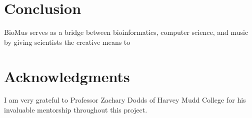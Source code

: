 \documentclass[letterpaper]{article}
\begin{document}
\section{Conclusion}
BioMus serves as a bridge between bioinformatics, computer science, and music by giving scientists the creative means to 


\section{Acknowledgments}

I am very grateful to Professor Zachary Dodds of Harvey Mudd College for his invaluable mentorship throughout this project.




\end{document}
